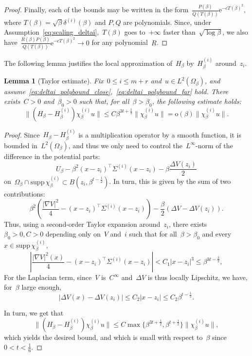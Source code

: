\documentclass[10pt]{article}
\newcommand{\e}{\mathrm{e}}
\newcommand{\1}{\mathbbm 1}
\newcommand{\scalingExp}{t}
\renewcommand{\o}{\mathrm{o}}
\newtheorem{lemma}{Lemma}
\begin{document}
\begin{proof}
        Finally, each of the bounds may be written in the form~$\frac{P(\beta)}{Q(T(\beta))}\e^{-cT(\beta)^2}$, where $T(\beta) = \sqrt\beta \delta^{(i)}(\beta)$ and $P,Q$ are polynomials. Since, under Assumption~\eqref{eq:scaling_deltai},~$T(\beta)$ goes to~$+\infty$ faster than~$\sqrt{\log\beta}$, we also have~$\frac{R(\beta)P(\beta)}{Q(T(\beta))}\e^{-cT(\beta)^2}\to 0$ for any polynomial~$R$.
    \end{proof}

    The following lemma justifies the local approximation of~$H_\beta$ by~$H_\beta^{(i)}$ around~$z_i$.
    \begin{lemma}[Taylor estimate]
        \label{lemma:taylor_bound}
        Fix~$0\leq i \leq m+r$ and~$u\in L^2(\Omega_\beta)$, and assume~\eqref{eq:deltai_polybound_close},~\eqref{eq:deltai_polybound_far} hold.
        There exists~$C>0$ and~$\beta_0>0$ such that, for all~$\beta>\beta_0$, the following estimate holds:
        \begin{equation}
            \label{eq:taylor_bound_witten}
            \|(H_\beta-H_\beta^{(i)})\chi_\beta^{(i)} u\| \leq C\beta^{3\scalingExp+\frac12}\|\chi_\beta^{(i)}u\| = \o(\beta)\|\chi_\beta^{(i)}u\|.
        \end{equation}
    \end{lemma}
    \begin{proof}
        Since~$H_\beta-H_\beta^{(i)}$ is a multiplication operator by a smooth function, it is bounded in~$L^2(\Omega_\beta)$, and thus we only need to control the~$L^\infty$-norm of the difference in the potential parts:
       ~$$U_\beta - \beta^2(x-z_i)^\intercal \Sigma^{(i)}(x-z_i) - \beta \frac{\Delta V(z_i)}2$$ on~$\Omega_\beta \cap\mathrm{supp}\,\chi_\beta^{(i)} \subset B(z_i,\beta^{\scalingExp-\frac12})$.
        In turn, this is given by the sum of two contributions:
       ~$$ \beta^2\left(\frac{|\nabla V|^2}4 - (x-z_i)^\intercal \Sigma^{(i)}(x-z_i) \right) - \frac\beta2(\Delta V - \Delta V(z_i)).$$
        Thus, using a second-order Taylor expansion around~$z_i$, there exists~$\beta_0>0, C>0$ depending only on~$V$ and~$i$ such that for all~$\beta>\beta_0$ and every~$x\in \mathrm{supp}\,\chi_\beta^{(i)}$, 
       ~$$\left|\frac{|\nabla V|^2(x)}4 - (x-z_i)^\intercal \Sigma^{(i)}(x-z_i)\right| < C_1 |x-z_i|^3 \leq \beta^{3\scalingExp-\frac32},$$
        For the Laplacian term, since~$V$ is~$C^\infty$ and~$\Delta V$ is thus locally Lipschitz, we have, for~$\beta$ large enough,
       ~$$ \left| \Delta V(x) - \Delta V(z_i)\right| \leq C_2|x-z_i|\leq C_2 \beta^{\scalingExp-\frac12}.$$

        In turn, we get that 
       ~$$\|(H_\beta-H_\beta^{(i)})\chi_\beta^{(i)} u\| \leq C\max\{\beta^{3\scalingExp+\frac12},\beta^{\scalingExp+\frac12}\}\|\chi_\beta^{(i)}u\|,$$
        which yields the desired bound, and which is small with respect to~$\beta$ since~$0<\scalingExp<\frac16$.
    \end{proof}
\end{document}
